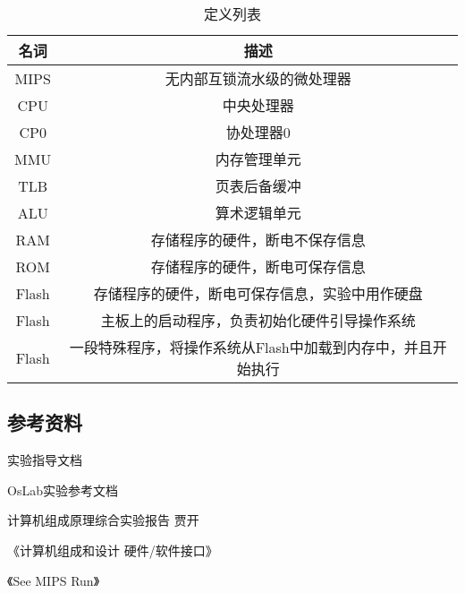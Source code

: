         \begin{table}[!hbp]
        \centering
        \caption{定义列表}
        \begin{tabular}{|c|c|}
        \hline
        名词 & 描述 \\
        \hline
        MIPS & 无内部互锁流水级的微处理器 \\
        \hline
        CPU &  中央处理器\\
        \hline
        CP0 & 协处理器0 \\
        \hline
        MMU & 内存管理单元 \\
        \hline
        TLB & 页表后备缓冲 \\
        \hline
        ALU & 算术逻辑单元 \\
        \hline
        RAM & 存储程序的硬件，断电不保存信息 \\
        \hline
        ROM & 存储程序的硬件，断电可保存信息 \\
        \hline
        Flash & 存储程序的硬件，断电可保存信息，实验中用作硬盘 \\
        \hline
        Flash & 主板上的启动程序，负责初始化硬件引导操作系统 \\
        \hline
        Flash & 一段特殊程序，将操作系统从Flash中加载到内存中，并且开始执行 \\
        \hline
        \end{tabular}
        \end{table}

    \subsection{参考资料}
        实验指导文档

        OsLab实验参考文档

        计算机组成原理综合实验报告 贾开

        《计算机组成和设计 硬件/软件接口》

        《See MIPS Run》


